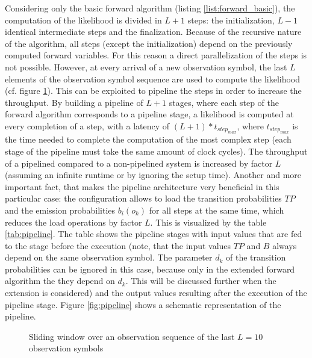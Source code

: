 \documentclass[mscthesis]{usiinfthesis}
\begin{document}
Considering only the basic forward algorithm (listing
\ref{list:forward_basic}), the computation of the likelihood is divided in
$L+1$ steps: the initialization, $L-1$ identical intermediate steps and the
finalization. Because of the recursive nature of the algorithm, all steps
(except the initialization) depend on the previously computed forward
variables. For this reason a direct parallelization of the steps is not
possible. However, at every arrival of a new observation symbol, the last $L$
elements of the observation symbol sequence are used to compute the likelihood
(cf. figure \ref{fig:sliding}). This can be exploited to pipeline the steps in
order to increase the throughput. By building a pipeline of $L+1$ stages, where
each step of the forward algorithm corresponds to a pipeline stage,
a likelihood is computed at every completion of a step, with a latency of
$(L+1)*t_{step_{max}}$, where $t_{step_{max}}$ is the time needed to complete
the computation of the most complex step (each stage of the pipeline must take
the same amount of clock cycles). The throughput of a pipelined compared to
a non-pipelined system is increased by factor $L$ (assuming an infinite runtime
or by ignoring the setup time). Another and more important fact, that makes the
pipeline architecture very beneficial in this particular case: the
configuration allows to load the transition probabilities $TP$ and the emission
probabilities $b_i(o_k)$ for all steps at the same time, which reduces the load
operations by factor $L$. This is visualized by the table \ref{tab:pipeline}.
The table shows the pipeline stages with input values that are fed to the stage
before the execution (note, that the input values $TP$ and $B$ always depend on
the same observation symbol. The parameter $d_k$ of the transition
probabilities can be ignored in this case, because only in the extended forward
algorithm the they depend on $d_k$. This will be discussed further when the
extension is considered) and the output values resulting after the execution of
the pipeline stage. Figure \ref{fig:pipeline} shows a schematic representation
of the pipeline.

\begin{figure}
    \centering
    
    \caption{Sliding window over an observation sequence of the
        last $L=10$ observation symbols}
    \label{fig:sliding}
\end{figure}
\end{document}
